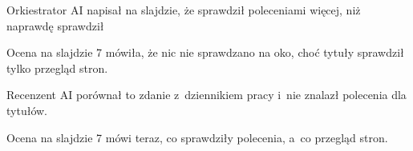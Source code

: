 \begin{frame}{Orkiestrator AI napisał na slajdzie, że sprawdził poleceniami więcej, niż naprawdę sprawdził}
  \begin{description}
    \item[Co się stało] Ocena na slajdzie 7 mówiła, że nic nie sprawdzano na oko, choć tytuły sprawdził tylko przegląd stron.
    \item[Jak to wykryto] Recenzent AI porównał to zdanie z~dziennikiem pracy i~nie znalazł polecenia dla tytułów.
    \item[Jak naprawiono] Ocena na slajdzie 7 mówi teraz, co sprawdziły polecenia, a~co przegląd stron.
  \end{description}
\end{frame}
